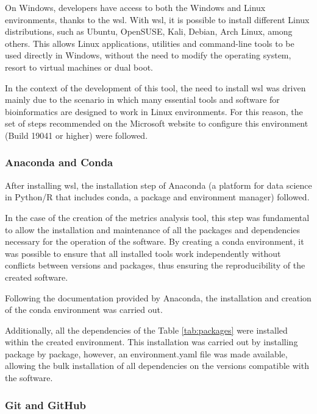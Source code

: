 On Windows, developers have access to both the Windows and Linux environments, thanks to the \ac{wsl}. With \ac{wsl}, it is possible to install different Linux distributions, such as Ubuntu, OpenSUSE, Kali, Debian, Arch Linux, among others. This allows Linux applications, utilities and command-line tools to be used directly in Windows, without the need to modify the operating system, resort to virtual machines or dual boot. \cite{wsl}

In the context of the development of this tool, the need to install \ac{wsl} was driven mainly due to the scenario in which many essential tools and software for bioinformatics are designed to work in Linux environments. For this reason, the set of steps recommended on the Microsoft website to configure this environment (Build 19041 or higher) were followed. \cite{wsl}

\subsubsection{\textbf{Anaconda and Conda}}

After installing \ac{wsl}, the installation step of Anaconda (a platform for data science in Python/R that includes conda, a package and environment manager) followed. \cite{anaconda1}

In the case of the creation of the metrics analysis tool, this step was fundamental to allow the installation and maintenance of all the packages and dependencies necessary for the operation of the software. By creating a conda environment, it was possible to ensure that all installed tools work independently without conflicts between versions and packages, thus ensuring the reproducibility of the created software. \cite{anaconda2}

Following the documentation provided by Anaconda, the installation and creation of the conda environment was carried out. \cite{anaconda3} 

Additionally, all the dependencies of the Table \ref{tab:packages} were installed within the created environment. This installation was carried out by installing package by package, however, an environment.yaml file was made available, allowing the bulk installation \cite{anaconda4} of all dependencies on the versions compatible with the software.

\subsubsection{\textbf{Git and GitHub}}

